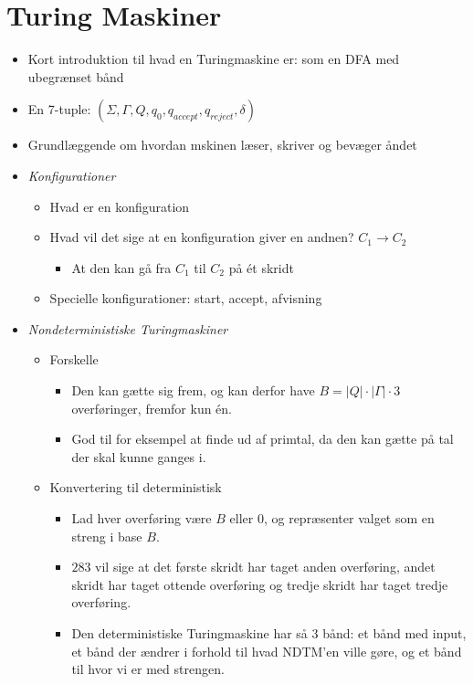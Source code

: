 \section*{Turing Maskiner}
\begin{itemize}
	\item Kort introduktion til hvad en Turingmaskine er: som en DFA med ubegrænset bånd
	\item En 7-tuple: $(\Sigma, \Gamma, Q, q_{0}, q_{accept}, q_{reject}, \delta)$
	\item Grundlæggende om hvordan mskinen læser, skriver og bevæger åndet
	\item \textit{Konfigurationer}
	      \begin{itemize}
		      \item Hvad er en konfiguration
		      \item Hvad vil det sige at en konfiguration giver en andnen? $C_{1} \rightarrow C_2$
		            \begin{itemize}
			            \item At den kan gå fra $C_{1}$ til $C_{2}$ på ét skridt
		            \end{itemize}
		      \item Specielle konfigurationer: start, accept, afvisning
	      \end{itemize}
	\item \textit{Nondeterministiske Turingmaskiner}
	      \begin{itemize}
		      \item Forskelle
		            \begin{itemize}
			            \item Den kan gætte sig frem, og kan derfor have $B = |Q| \cdot |\Gamma| \cdot 3$ overføringer, fremfor kun én.
			            \item God til for eksempel at finde ud af primtal, da den kan gætte på tal der skal kunne ganges i.
		            \end{itemize}
		      \item Konvertering til deterministisk
		            \begin{itemize}
			            \item Lad hver overføring være $B$ eller $0$, og repræsenter valget som en streng i base $B$.
			            \item $283$ vil sige at det første skridt har taget anden overføring, andet skridt har taget ottende overføring og tredje skridt har taget tredje overføring.
			            \item Den deterministiske Turingmaskine har så 3 bånd: et bånd med input, et bånd der ændrer i forhold til hvad NDTM'en ville gøre, og et bånd til hvor vi er med strengen.

\end{itemize}
\end{itemize}
\end{itemize}
